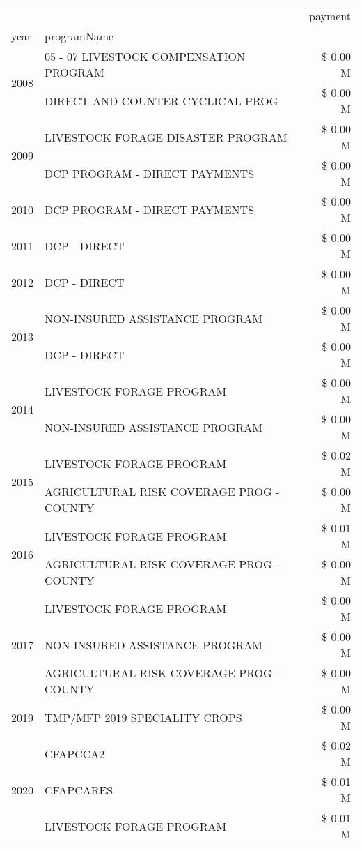 \begin{tabular}{llr}
\toprule
 &  & payment \\
year & programName &  \\
\midrule
\multirow[t]{2}{*}{2008} & 05 - 07 LIVESTOCK COMPENSATION PROGRAM & \$ 0.00 M \\
 & DIRECT AND COUNTER CYCLICAL PROG & \$ 0.00 M \\
\cline{1-3}
\multirow[t]{2}{*}{2009} & LIVESTOCK FORAGE DISASTER  PROGRAM & \$ 0.00 M \\
 & DCP PROGRAM - DIRECT PAYMENTS & \$ 0.00 M \\
\cline{1-3}
2010 & DCP PROGRAM - DIRECT PAYMENTS & \$ 0.00 M \\
\cline{1-3}
2011 & DCP - DIRECT & \$ 0.00 M \\
\cline{1-3}
2012 & DCP - DIRECT & \$ 0.00 M \\
\cline{1-3}
\multirow[t]{2}{*}{2013} & NON-INSURED ASSISTANCE PROGRAM & \$ 0.00 M \\
 & DCP - DIRECT & \$ 0.00 M \\
\cline{1-3}
\multirow[t]{2}{*}{2014} & LIVESTOCK FORAGE PROGRAM & \$ 0.00 M \\
 & NON-INSURED ASSISTANCE PROGRAM & \$ 0.00 M \\
\cline{1-3}
\multirow[t]{2}{*}{2015} & LIVESTOCK FORAGE PROGRAM & \$ 0.02 M \\
 & AGRICULTURAL RISK COVERAGE PROG - COUNTY & \$ 0.00 M \\
\cline{1-3}
\multirow[t]{2}{*}{2016} & LIVESTOCK FORAGE PROGRAM                      & \$ 0.01 M \\
 & AGRICULTURAL RISK COVERAGE PROG - COUNTY      & \$ 0.00 M \\
\cline{1-3}
\multirow[t]{3}{*}{2017} & LIVESTOCK FORAGE PROGRAM & \$ 0.00 M \\
 & NON-INSURED ASSISTANCE PROGRAM & \$ 0.00 M \\
 & AGRICULTURAL RISK COVERAGE PROG - COUNTY & \$ 0.00 M \\
\cline{1-3}
2019 & TMP/MFP 2019 SPECIALITY CROPS & \$ 0.00 M \\
\cline{1-3}
\multirow[t]{3}{*}{2020} & CFAPCCA2 & \$ 0.02 M \\
 & CFAPCARES & \$ 0.01 M \\
 & LIVESTOCK FORAGE PROGRAM & \$ 0.01 M \\
\cline{1-3}
\bottomrule
\end{tabular}
